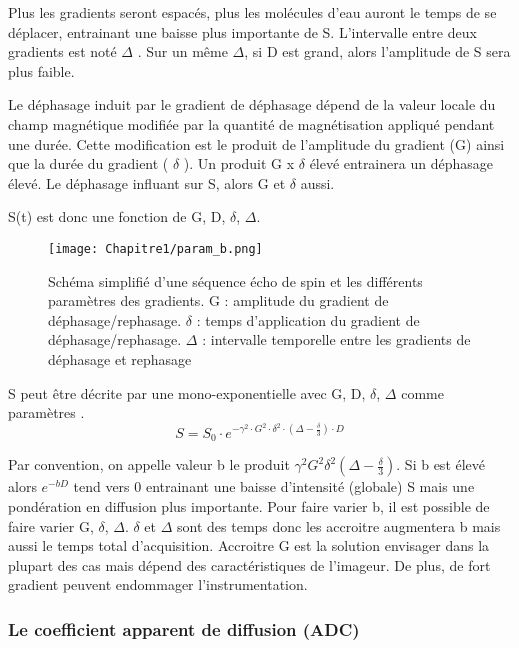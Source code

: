 Plus les gradients seront espacés, plus les molécules d’eau auront le temps de se déplacer, entrainant une baisse plus importante de S. L’intervalle entre deux gradients est noté $\Delta$ . Sur un même $\Delta$, si D est grand, alors l’amplitude de S sera plus faible.

Le déphasage induit par le gradient de déphasage dépend de la valeur locale du champ magnétique modifiée par la quantité de magnétisation appliqué pendant une durée. Cette modification est le produit de l’amplitude du gradient (G) ainsi que la durée du gradient ( $\delta$ ). Un produit G x $\delta$ élevé entrainera un déphasage élevé. Le déphasage influant sur S, alors G et $\delta$ aussi.

S(t) est donc une fonction de G, D, $\delta$, $\Delta$. 

\begin{figure}[!htbp]
  \begin{center}
    \texttt{[image: Chapitre1/param\_b.png]}
     \end{center}
    \caption{Schéma simplifié d’une séquence écho de spin et les différents paramètres des gradients. G : amplitude du gradient de déphasage/rephasage. $\delta$ : temps d’application du gradient de déphasage/rephasage. $\Delta$ : intervalle temporelle entre les gradients de déphasage et rephasage}
  \label{fig:param_b}
\end{figure}

S peut être décrite par une mono-exponentielle avec G, D, $\delta$, $\Delta$ comme paramètres \cite{2014_2}. 
\begin{equation}
\nonumber
S= S_0 \cdot e^{-\gamma^2 \cdot G^2 \cdot\delta ^2 \cdot (\Delta-\frac{\delta}{3}) \cdot D}
\end{equation}

Par convention, on appelle valeur b le produit $\gamma^2G^2\delta^2 (\Delta -\frac{\delta}{3})$. Si b est élevé alors $e^{-bD}$ tend vers 0 entrainant une baisse d’intensité (globale) S mais une pondération en diffusion plus importante. Pour faire varier b, il est possible de faire varier G, $\delta$, $\Delta$. $\delta$ et $\Delta$ sont des temps donc les accroitre augmentera b mais aussi le temps total d’acquisition. Accroitre G est la solution envisager dans la plupart des cas mais dépend des caractéristiques de l'imageur. De plus, de fort gradient peuvent endommager l’instrumentation.

\subsubsection{Le coefficient apparent de diffusion (ADC)}

